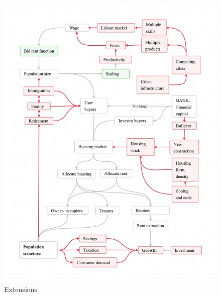 {\newpage\thispagestyle{empty}
\vspace{-1.5cm}

\begin{figure}
\vspace{-4.5cm}
\begin{adjustwidth}{-0.24\textwidth}{-0.2\textwidth}
\centering
\includegraphics[scale=.20]{fig/extensions3.png}
\end{adjustwidth}
\caption{Extensions}
\label{fig-extensions-logic}
\end{figure}}